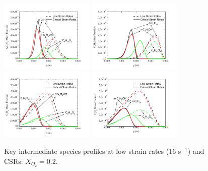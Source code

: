 \documentclass[review,3p,times]{elsarticleUS}
\begin{document}
\begin{figure}[t]
  \centering
  \scriptsize
  \includegraphics[trim=4mm 8mm 30mm 20mm, clip=true, width=0.4\textwidth]{A-C3H5-y.png}
  \includegraphics[trim=4mm 8mm 30mm 20mm, clip=true, width=0.4\textwidth]{C3H3-y.png}
  \includegraphics[trim=4mm 8mm 30mm 20mm, clip=true, width=0.4\textwidth]{C5H6-y.png}
  \includegraphics[trim=4mm 8mm 30mm 20mm, clip=true, width=0.4\textwidth]{A1-y.png}
  \normalsize
  \vspace{-0.1in}
  \caption{Key intermediate species profiles at low strain rates ($16$ s$^{-1}$) and CSRs: $X_{O_2}=0.2$.}
  \label{fig:CxHy}
\end{figure}
\end{document}
